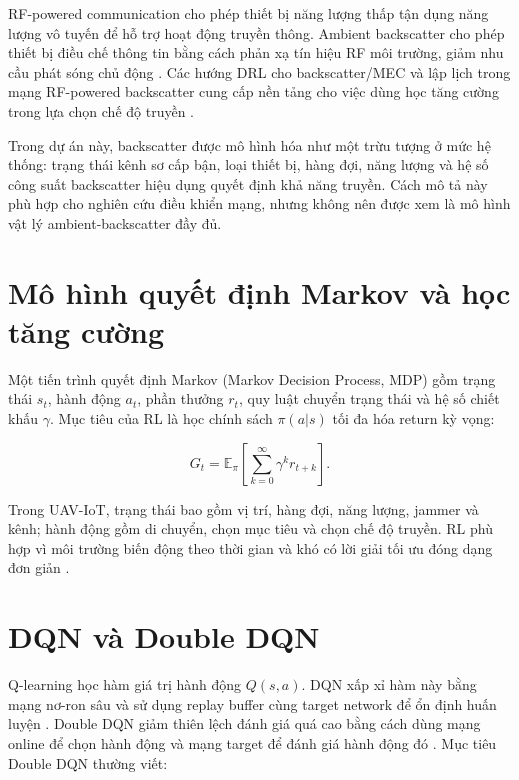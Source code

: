 RF-powered communication cho phép thiết bị năng lượng thấp tận dụng năng lượng vô tuyến để hỗ trợ hoạt động truyền thông. Ambient backscatter cho phép thiết bị điều chế thông tin bằng cách phản xạ tín hiệu RF môi trường, giảm nhu cầu phát sóng chủ động \cite{huynh2018rfpowered}. Các hướng DRL cho backscatter/MEC và lập lịch trong mạng RF-powered backscatter cung cấp nền tảng cho việc dùng học tăng cường trong lựa chọn chế độ truyền \cite{gong2020drlbackscattermec,tran2018ddqntimescheduling}.

Trong dự án này, backscatter được mô hình hóa như một trừu tượng ở mức hệ thống: trạng thái kênh sơ cấp bận, loại thiết bị, hàng đợi, năng lượng và hệ số công suất backscatter hiệu dụng quyết định khả năng truyền. Cách mô tả này phù hợp cho nghiên cứu điều khiển mạng, nhưng không nên được xem là mô hình vật lý ambient-backscatter đầy đủ.

\section{Mô hình quyết định Markov và học tăng cường}

Một tiến trình quyết định Markov (Markov Decision Process, MDP) gồm trạng thái \(s_t\), hành động \(a_t\), phần thưởng \(r_t\), quy luật chuyển trạng thái và hệ số chiết khấu \(\gamma\). Mục tiêu của RL là học chính sách \(\pi(a|s)\) tối đa hóa return kỳ vọng:

\begin{equation}
G_t=\mathbb{E}_{\pi}\left[\sum_{k=0}^{\infty}\gamma^k r_{t+k}\right].
\label{eq:return}
\end{equation}

Trong UAV-IoT, trạng thái bao gồm vị trí, hàng đợi, năng lượng, jammer và kênh; hành động gồm di chuyển, chọn mục tiêu và chọn chế độ truyền. RL phù hợp vì môi trường biến động theo thời gian và khó có lời giải tối ưu đóng dạng đơn giản \cite{sutton2018reinforcement}.

\section{DQN và Double DQN}

Q-learning học hàm giá trị hành động \(Q(s,a)\). DQN xấp xỉ hàm này bằng mạng nơ-ron sâu và sử dụng replay buffer cùng target network để ổn định huấn luyện \cite{mnih2015dqn}. Double DQN giảm thiên lệch đánh giá quá cao bằng cách dùng mạng online để chọn hành động và mạng target để đánh giá hành động đó \cite{vanhasselt2016ddqn}. Mục tiêu Double DQN thường viết:

